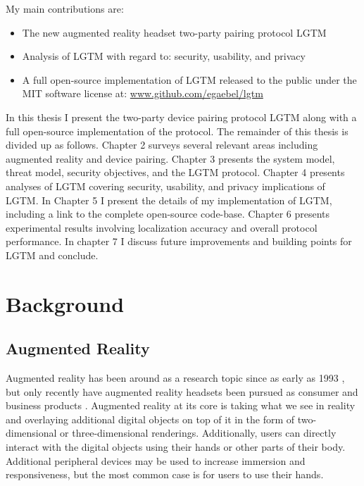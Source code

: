 \documentclass[12pt]{report}
\begin{document}
My main contributions are: \\

\begin{itemize}
    \item The new augmented reality headset two-party pairing protocol LGTM
    \item Analysis of LGTM with regard to: security, usability, and privacy
    \item A full open-source implementation of LGTM released to the public under the MIT software license at: \url{www.github.com/egaebel/lgtm}
\end{itemize}

In this thesis I present the two-party device pairing protocol LGTM along with a full open-source implementation of the protocol. The remainder of this thesis is divided up as follows. Chapter 2 surveys several relevant areas including augmented reality and device pairing. Chapter 3 presents the system model, threat model, security objectives, and the LGTM protocol. Chapter 4 presents analyses of LGTM covering security, usability, and privacy implications of LGTM. In Chapter 5 I present the details of my implementation of LGTM, including a link to the complete open-source code-base. Chapter 6 presents experimental results involving localization accuracy and overall protocol performance. In chapter 7 I discuss future improvements and building points for LGTM and conclude. \par


\chapter{Background}
\section{Augmented Reality}
Augmented reality has been around as a research topic since as early as 1993 \cite{RealWorldArWellnet1993}, but only recently have augmented reality headsets been pursued as consumer and business products \cite{MagicLeapWebsite,MetaWebsite,HoloLensWebsite,GoogleGlassWebsite}. Augmented reality at its core is taking what we see in reality and overlaying additional digital objects on top of it in the form of two-dimensional or three-dimensional renderings. Additionally, users can directly interact with the digital objects using their hands or other parts of their body. Additional peripheral devices may be used to increase immersion and responsiveness, but the most common case is for users to use their hands. \par
\end{document}
